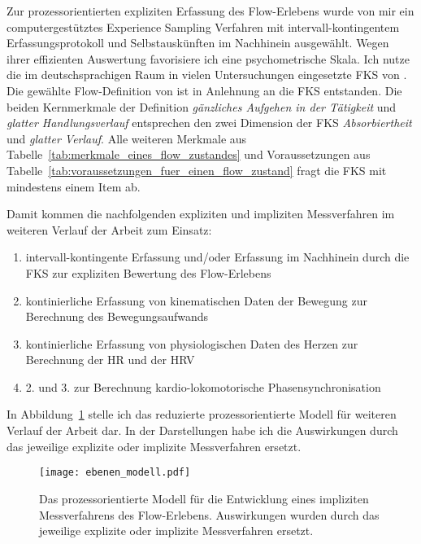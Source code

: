 Zur prozessorientierten expliziten Erfassung des Flow-Erlebens wurde von mir ein computergestütztes Experience Sampling Verfahren mit intervall-kontingentem Erfassungsprotokoll und Selbstauskünften im Nachhinein ausgewählt. Wegen ihrer effizienten Auswertung favorisiere ich eine psychometrische Skala. Ich nutze die im deutschsprachigen Raum in vielen Untersuchungen eingesetzte \ac{FKS} von \citet{Rheinberg2003}. Die gewählte Flow-Definition von \citet{Henk2014} ist in Anlehnung an die \ac{FKS} entstanden. Die beiden Kernmerkmale der Definition \emph{gänzliches Aufgehen in der Tätigkeit} und \emph{glatter Handlungsverlauf} entsprechen den zwei Dimension der \ac{FKS} \emph{Absorbiertheit} und \emph{glatter Verlauf}. Alle weiteren Merkmale aus Tabelle~\ref{tab:merkmale_eines_flow_zustandes} und Voraussetzungen aus Tabelle~\ref{tab:voraussetzungen_fuer_einen_flow_zustand} fragt die \ac{FKS} mit mindestens einem Item ab. 

Damit kommen die nachfolgenden expliziten und impliziten Messverfahren im weiteren Verlauf der Arbeit zum Einsatz:

\begin{enumerate}

	\item intervall-kontingente Erfassung und/oder Erfassung im Nachhinein durch die \ac{FKS} zur expliziten Bewertung des Flow-Erlebens

	\item kontinierliche Erfassung von kinematischen Daten der Bewegung zur Berechnung des Bewegungsaufwands

	\item kontinierliche Erfassung von physiologischen Daten des Herzen zur Berechnung der \ac{HR} und der \ac{HRV}

	\item 2. und 3. zur Berechnung kardio-lokomotorische Phasensynchronisation

\end{enumerate}

In Abbildung~\ref{fig:ebenen_modell} stelle ich das reduzierte prozessorientierte Modell für weiteren Verlauf der Arbeit dar. In der Darstellungen habe ich die Auswirkungen durch das jeweilige explizite oder implizite Messverfahren ersetzt. 

\begin{figure}[!htb]
	\centering
		\texttt{[image: ebenen\_modell.pdf]}
	\caption[Das prozessorientierte Modell für die Entwicklung eines impliziten Messverfahrens des Flow-Erlebens]{Das prozessorientierte Modell für die Entwicklung eines impliziten Messverfahrens des Flow-Erlebens. Auswirkungen wurden durch das jeweilige explizite oder implizite Messverfahren ersetzt.}
	\label{fig:ebenen_modell}
\end{figure}

